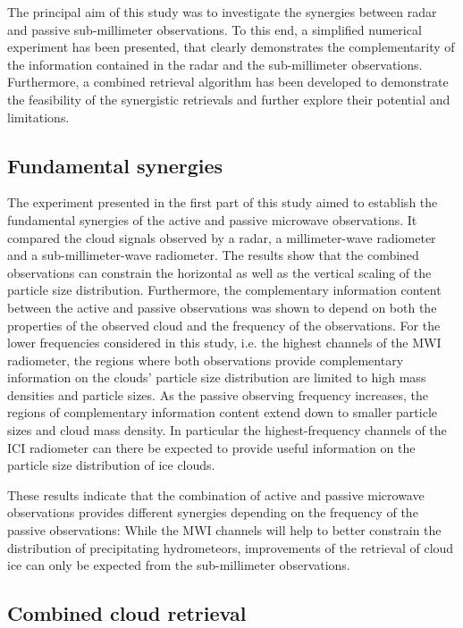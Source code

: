 \documentclass[journal abbreviation, manuscript]{copernicus}
\begin{document}
The principal aim of this study was to investigate the synergies between radar
and passive sub-millimeter observations. To this end, a simplified numerical
experiment has been presented, that clearly demonstrates the complementarity of
the information contained in the radar and the sub-millimeter observations.
Furthermore, a combined retrieval algorithm has been developed to demonstrate
the feasibility of the synergistic retrievals and further explore their
potential and limitations.

\subsection{Fundamental synergies}

The experiment presented in the first part of this study aimed to establish the
fundamental synergies of the active and passive microwave observations. It
compared the cloud signals observed by a radar, a millimeter-wave radiometer and
a sub-millimeter-wave radiometer. The results show that the combined
observations can constrain the horizontal as well as the vertical scaling of the
particle size distribution. Furthermore, the complementary information content
between the active and passive observations was shown to depend on both the
properties of the observed cloud and the frequency of the observations. For the
lower frequencies considered in this study, i.e. the highest channels of the MWI
radiometer, the regions where both observations provide complementary
information on the clouds' particle size distribution are limited to high mass
densities and particle sizes. As the passive observing frequency increases, the
regions of complementary information content extend down to smaller particle
sizes and cloud mass density. In particular the highest-frequency channels of
the ICI radiometer can there be expected to provide useful information on the
particle size distribution of ice clouds.

These results indicate that the combination of active and passive microwave
observations provides different synergies depending on the frequency of the
passive observations: While the MWI channels will help to better constrain the
distribution of precipitating hydrometeors, improvements of the retrieval of
cloud ice can only be expected from the sub-millimeter observations.

\subsection{Combined cloud retrieval}
\end{document}
